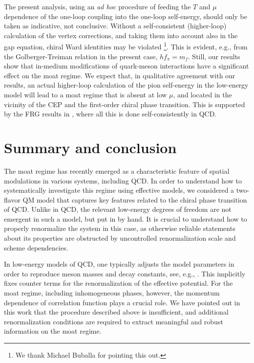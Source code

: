 \documentclass[reprint,english,superscriptaddress,preprintnumbers,amsmath,amssymb,aps,prd]{revtex4-2}
\begin{document}
The present analysis, using an \emph{ad hoc} procedure of feeding the $T$ and $\mu$ dependence of the one-loop coupling into the one-loop self-energy, should only be taken as indicative, not conclusive. Without a self-consistent (higher-loop) calculation of the vertex corrections, and taking them into account also in the gap equation, chiral Ward identities may be violated \footnote{We thank Michael Buballa for pointing this out.}. This is evident, e.g., from the Golberger-Treiman relation in the present case, $h f_\pi = m_f$. Still, our results show that in-medium modifications of quark-meson interactions have a significant effect on the moat regime. We expect that, in qualitative agreement with our results, an actual higher-loop calculation of the pion self-energy in the low-energy model will lead to a moat regime that is absent at low $\mu$, and located in the vicinity of the CEP and the first-order chiral phase transition. This is supported by the FRG results in \cite{Fu:2019hdw, Fu:2024rto}, where all this is done self-consistently in QCD.

\section{Summary and conclusion}\label{sec:summary}

The moat regime has recently emerged as a characteristic feature of spatial modulations in various systems, including QCD. In order to understand how to systematically investigate this regime using effective models, we considered a two-flavor QM model that captures key features related to the chiral phase transition of QCD. Unlike in QCD, the relevant low-energy degrees of freedom are not emergent in such a model, but put in by hand. It is crucial to understand how to properly renormalize the system in this case, as otherwise reliable statements about its properties are obstructed by uncontrolled renormalization scale and scheme dependencies.

In low-energy models of QCD, one typically adjusts the model parameters in order to reproduce meson masses and decay constants, see, e.g., \cite{Klevansky:1992qe}. This implicitly fixes counter terms for the renormalization of the effective potential. For the moat regime, including inhomogeneous phases, however, the momentum dependence of correlation function plays a crucial role. We have pointed out in this work that the procedure described above is insufficient, and additional renormalization conditions are required to extract meaningful and robust information on the moat regime.
\end{document}
